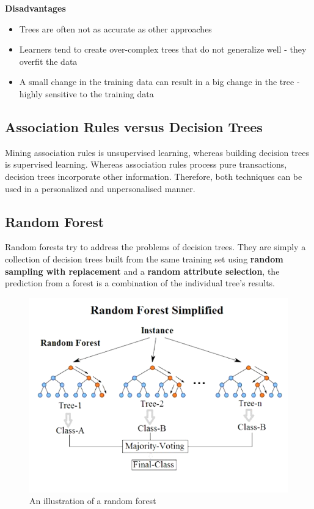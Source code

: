 \documentclass[11pt]{article}
\begin{document}
\noindent
\textbf{Disadvantages}
\begin{itemize}
    \item Trees are often not as accurate as other approaches
    \item Learners tend to create over-complex trees that do not generalize well - they overfit the data
    \item A small change in the training data can result in a big change in the tree - highly sensitive to the training data
\end{itemize}

\subsection{Association Rules versus Decision Trees}

Mining association rules is unsupervised learning, whereas building decision trees is supervised learning. Whereas association rules process pure transactions, decision trees incorporate other information. Therefore, both techniques can be used in a personalized and unpersonalised manner.

\subsection{Random Forest}

Random forests try to address the problems of decision trees. They are simply a collection of decision trees built from the same training set using \textbf{random sampling with replacement} and a \textbf{random attribute selection}, the prediction from a forest is a combination of the individual tree's results.

\begin{figure}[tbh!]
    \centering
    \includegraphics[width=0.7\linewidth, keepaspectratio]{random_forest_diagram}
    \caption{An illustration of a random forest}
    \label{fig:randomforest}
\end{figure}
\end{document}
